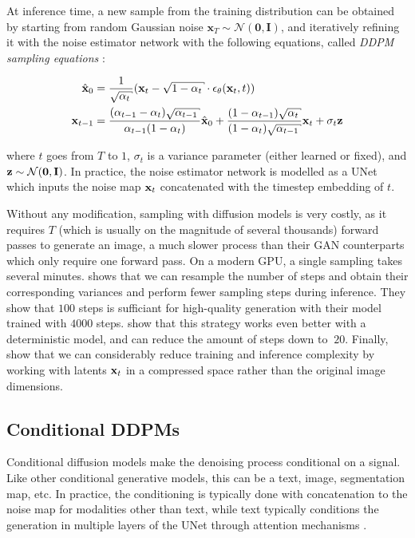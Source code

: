 
At inference time, a new sample from the training distribution can be obtained by starting from 
random Gaussian noise $\mathbf{x}_T \sim \mathcal{N}(\mathbf{0}, \mathbf{I})$, and iteratively
refining it with the noise estimator network with the following equations, called 
\textit{DDPM sampling equations} \citep{ho2020denoising}:

\begin{align*}
      \hat{\x}_0 &= \frac{1}{\sqrt{\alpha_t}}(\x_t - \sqrt{1 - \alpha_t} \cdot \epsilon_\theta(\x_t, t)) \\
      \x_{t-1} &= \frac{(\alpha_{t-1}-\alpha_t) \sqrt{\alpha_{t-1}}}{\alpha_{t-1}(1 - \alpha_t)} \hat{\x}_0 + \frac{(1-\alpha_{t-1})\sqrt{\alpha_t}}{(1 - \alpha_t)\sqrt{\alpha_{t-1}}} \x_t + \sigma_t \z
\end{align*}

where $t$ goes from $T$ to $1$, 
$\sigma_t$ is a variance parameter (either learned or fixed), and $\mathbf{z} \sim \mathcal{N}(\mathbf{0}, \mathbf{I})$.
In practice, the noise estimator network is modelled as a UNet \citep{ronneberger2015UNet} 
which inputs the noise map $\mathbf{x}_t$ concatenated with the timestep embedding of $t$. 


Without any modification, sampling with diffusion models is very costly, as it requires $T$
(which is usually on the magnitude of several thousands) forward passes to generate an image, a much slower 
process than their \ac{GAN} counterparts which only require one forward pass. On a modern 
GPU, a single sampling takes several minutes. \cite{nichol2021improved} shows that we can 
resample the number of steps and obtain their corresponding variances and perform fewer 
sampling steps during inference. They show that $100$  steps is sufficiant for high-quality 
generation with their model trained with $4000$ steps. \cite{song2021denoising} show that 
this strategy works even better with a deterministic model, and can reduce the amount of steps
down to $~20$. Finally, \cite{rombach2022high} show that we can considerably reduce training and 
inference complexity by working with latents $\mathbf{x}_t$ in a compressed space rather than 
the original image dimensions.

\subsection{Conditional DDPMs}\label{subsection:conditional_ddpm}

Conditional diffusion models \citep{chen2021wavegrad, saharia2022image, saharia2022palette}
make the denoising process conditional on a signal. Like other conditional generative models, 
this can be  a text, image, segmentation map, etc. In practice, the conditioning is 
typically done with concatenation to the noise map for modalities other than text, 
while text typically conditions the generation in multiple layers of the 
UNet through attention mechanisms \citep{nichol2021glide, rombach2022high, saharia2022photorealistic}.

